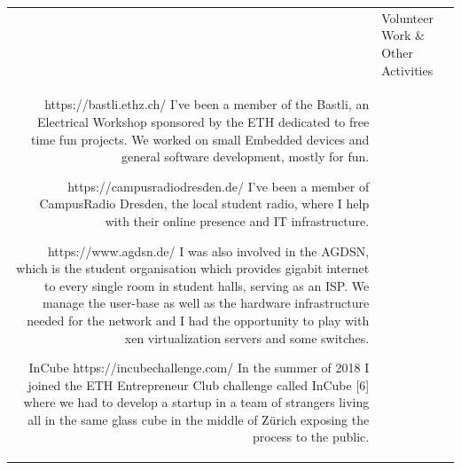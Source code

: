 \documentclass[letterpaper,12pt]{article}
\newcommand{\headingfont}{\Large\color{accent}\BluuNext}
\newenvironment{SectionTable}[1]{
	\renewcommand*{\arraystretch}{1.7}
	\setlength{\tabcolsep}{10pt}
	\begin{longtable}{Rp{5.2in}} & #1 \\}
{\end{longtable}\vspace{-.3cm}}
\begin{document}
\begin{SectionTable}{\headingfont Volunteer Work \& Other Activities}

  {https://bastli.ethz.ch/}
  { I’ve been a member of the Bastli, an Electrical Workshop sponsored by the ETH dedicated to free time fun projects. We worked on small Embedded devices and general software development, mostly for fun.}

  {https://campusradiodresden.de/}
  {I've been a member of CampusRadio Dresden, the local student radio, where I help with their online presence and IT infrastructure. }

  {https://www.agdsn.de/}
  {I was also involved in the AGDSN, which is the student organisation which provides gigabit internet to every single room in student halls, serving as an ISP. We manage the user-base as well as the hardware infrastructure needed for the network and I had the opportunity to play with xen virtualization servers and some switches.}

  \volunteer
  {InCube}
  {https://incubechallenge.com/}
  {In the summer of 2018 I joined the ETH Entrepreneur Club challenge called InCube [6] where we had to develop a startup in a team of strangers living all in the same glass cube in the middle of Zürich exposing the process to the public. }

\end{SectionTable}
\end{document}
